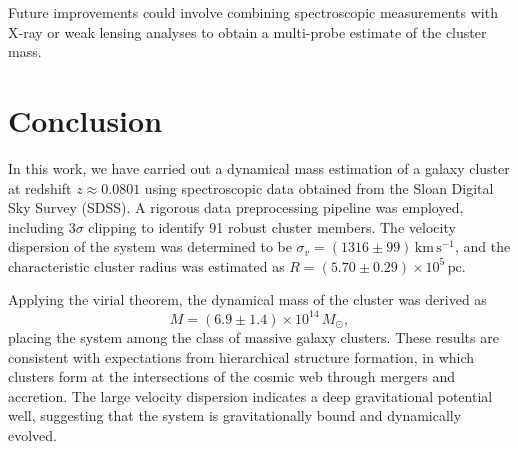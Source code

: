 \documentclass[12pt]{article}
\begin{document}
Future improvements could involve combining spectroscopic measurements with 
X-ray or weak lensing analyses to obtain a multi-probe estimate of the cluster mass.
\newpage
\section{Conclusion}
In this work, we have carried out a dynamical mass estimation of a galaxy cluster 
at redshift $z \approx 0.0801$ using spectroscopic data obtained from the Sloan Digital 
Sky Survey (SDSS). A rigorous data preprocessing pipeline was employed, including 
3$\sigma$ clipping to identify 91 robust cluster members. The velocity dispersion 
of the system was determined to be 
$\sigma_v = (1316 \pm 99)\,\mathrm{km \, s^{-1}}$, 
and the characteristic cluster radius was estimated as 
$R = (5.70 \pm 0.29) \times 10^{5}\,\mathrm{pc}$.

Applying the virial theorem, the dynamical mass of the cluster was derived as
\[
    M = (6.9 \pm 1.4) \times 10^{14}\,M_{\odot},
\]
placing the system among the class of massive galaxy clusters. These results are 
consistent with expectations from hierarchical structure formation, in which 
clusters form at the intersections of the cosmic web through mergers and accretion. 
The large velocity dispersion indicates a deep gravitational potential well, 
suggesting that the system is gravitationally bound and dynamically evolved.
\end{document}
